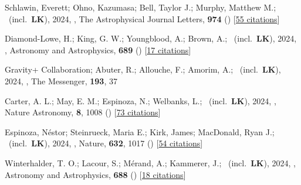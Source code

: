 \item[{\color{numcolor}\scriptsize123}] Schlawin, Everett; Ohno, Kazumasa; Bell, Taylor J.; Murphy, Matthew M.; \etal\ (incl.\ \textbf{LK}), 2024, , The Astrophysical Journal Letters, \textbf{974} () [\href{https://ui.adsabs.harvard.edu/abs/2024ApJ...974L..33S}{55 citations}]

\item[{\color{numcolor}\scriptsize122}] Diamond-Lowe, H.; King, G. W.; Youngblood, A.; Brown, A.; \etal\ (incl.\ \textbf{LK}), 2024, , Astronomy and Astrophysics, \textbf{689} () [\href{https://ui.adsabs.harvard.edu/abs/2024A&A...689A..48D}{17 citations}]

\item[{\color{numcolor}\scriptsize121}] Gravity+ Collaboration; Abuter, R.; Allouche, F.; Amorim, A.; \etal\ (incl.\ \textbf{LK}), 2024, , The Messenger, \textbf{193}, 37

\item[{\color{numcolor}\scriptsize120}] Carter, A. L.; May, E. M.; Espinoza, N.; Welbanks, L.; \etal\ (incl.\ \textbf{LK}), 2024, , Nature Astronomy, \textbf{8}, 1008 () [\href{https://ui.adsabs.harvard.edu/abs/2024NatAs...8.1008C}{73 citations}]

\item[{\color{numcolor}\scriptsize119}] Espinoza, N{\'e}stor; Steinrueck, Maria E.; Kirk, James; MacDonald, Ryan J.; \etal\ (incl.\ \textbf{LK}), 2024, , Nature, \textbf{632}, 1017 () [\href{https://ui.adsabs.harvard.edu/abs/2024Natur.632.1017E}{54 citations}]

\item[{\color{numcolor}\scriptsize118}] Winterhalder, T. O.; Lacour, S.; M{\'e}rand, A.; Kammerer, J.; \etal\ (incl.\ \textbf{LK}), 2024, , Astronomy and Astrophysics, \textbf{688} () [\href{https://ui.adsabs.harvard.edu/abs/2024A&A...688A..44W}{18 citations}]

